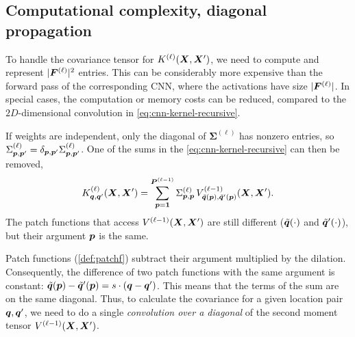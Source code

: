 \documentclass[accepted]{uai2021} %
\newcommand{\layersizebase}{\vF}
\newcommand{\layersize}[1]{{\layersizebase^{\bra{#1}}}}
\newcommand{\patchsizebase}{\vP}
\newcommand{\patchsize}[1]{{\patchsizebase^{\bra{#1}}}}
\newcommand{\patchf}[2]{{\tilde#1\bra{#2}}}
\newcommand{\priorWcovs}[1]{\Sigma^{(#1)}}
\newcommand{\priorWcov}[1]{\boldsymbol{\Sigma}^{(#1)}}
\newcommand{\patch}{\vp}               %
\newcommand{\nextpatch}{\vq}
\newcommand{\covf}[1]{K\ssup{#1}}
\newcommand{\nlinf}[1]{V\ssup{#1}}
\newcommand{\0}{\boldsymbol{0}}
\newcommand{\1}{\boldsymbol{1}}
\newcommand{\crefp}[1]{(\cref{#1})}
\begin{document}

\subsection{Computational complexity, diagonal propagation}
To handle the covariance tensor for $\covf{\ell}\bra{\mX,\mX'}$, we need to compute and represent $\absshort{\layersize{\ell}}^{2}$ entries. This can be considerably more expensive than the forward pass of the corresponding CNN, where the activations have size $\absshort{\layersize{\ell}}$.
In special cases, the computation or memory costs can be reduced, compared to the $2D$-dimensional convolution in \cref{eq:cnn-kernel-recursive}.

If weights are independent, only the diagonal of $\priorWcov{\ell}$ has nonzero entries, so $\priorWcovs{\ell}_{\patch,\patch'} = \delta_{\patch,\patch'}\priorWcovs{\ell}_{\patch,\patch'}$. One of the sums in the \cref{eq:cnn-kernel-recursive} can then be removed,
\begin{equation}
\covf{\ell}_{\nextpatch,\nextpatch'}\bra{\mX, \mX'} =
\sum_{\patch=\1}^{\patchsize{\ell-1}}
\priorWcovs{\ell}_{\patch,\patch} \,
\nlinf{\ell-1}_{\patchf{\nextpatch}{\patch},\patchf{\nextpatch'}{\patch}}\bra{\mX, \mX'}.
\label{eq:cnn-kernel-independent-weights}
\end{equation}
The patch functions that access $\nlinf{\ell-1}\bra{\mX,\mX'}$ are still
different ($\patchf{\nextpatch}{\cdot}$ and $\patchf{\nextpatch'}{\cdot}$), but
their argument $\patch$ is the same.

Patch functions \crefp{def:patchf} subtract their argument multiplied by the dilation. Consequently, the difference  of two patch functions with the same argument is constant: $\patchf{\nextpatch}{\patch} - \patchf{\nextpatch'}{\patch} = s\cdot\bra{\nextpatch - \nextpatch'}$. This means that the terms of the sum are on the same diagonal. Thus, to calculate the covariance for a given location pair $\nextpatch,\nextpatch'$, we need to do a single \emph{convolution over a diagonal} of the second moment tensor $\nlinf{\ell-1}\bra{\mX, \mX'}$.
\end{document}

